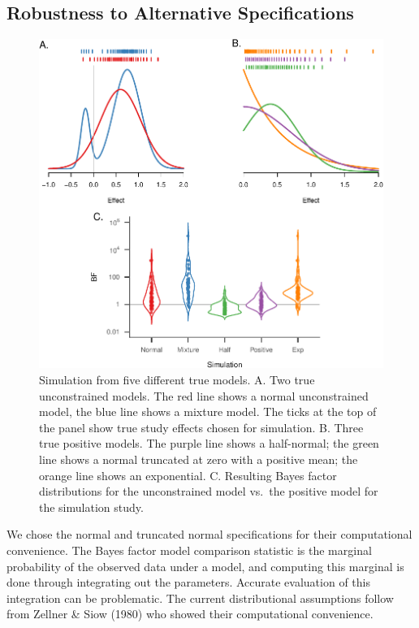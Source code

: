 \documentclass[english,man]{apa6}
\theoremstyle{definition}
\theoremstyle{definition}
\theoremstyle{remark}
\begin{document}
\subsection{Robustness to Alternative
Specifications}\label{robustness-to-alternative-specifications}

\begin{figure}[htbp]
\centering
\includegraphics{p_files/figure-latex/fig-alt-spec-1.pdf}
\caption{\label{fig:fig-alt-spec}Simulation from five different true models.
A. Two true unconstrained models. The red line shows a normal
unconstrained model, the blue line shows a mixture model. The ticks at
the top of the panel show true study effects chosen for simulation. B.
Three true positive models. The purple line shows a half-normal; the
green line shows a normal truncated at zero with a positive mean; the
orange line shows an exponential. C. Resulting Bayes factor
distributions for the unconstrained model vs.~the positive model for the
simulation study.}
\end{figure}

We chose the normal and truncated normal specifications for their
computational convenience. The Bayes factor model comparison statistic
is the marginal probability of the observed data under a model, and
computing this marginal is done through integrating out the parameters.
Accurate evaluation of this integration can be problematic. The current
distributional assumptions follow from Zellner \& Siow (1980) who showed
their computational convenience.
\end{document}
